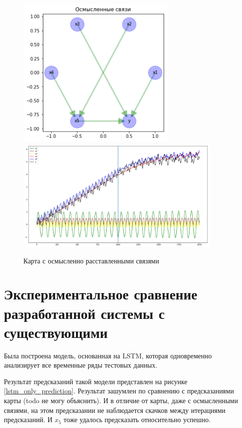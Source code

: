 \begin{figure}
	\centering
	\includegraphics[width=0.7\textwidth]{./img/lstmfcm_meaningful.png}
	\includegraphics[width=0.9\textwidth]{./img/lstmfcm_meaningful_prediction.png}
	\caption{Карта с осмысленно расставленными связями}
	\label{pic:lstmfcm_meaningful}
\end{figure}


\section{Экспериментальное сравнение разработанной системы с существующими}

Была построена модель, основанная на LSTM,
которая одновременно анализирует все временные ряды тестовых данных.

Результат предсказаний такой модели представлен на рисунке \ref{lstm_only_prediction}.
Результат зашумлен по сравнению с предсказаниями карты (todo не могу объяснить).
И в отличие от карты, даже с осмысленными связями, на этом предсказании не наблюдается скачков
между итерациями предсказаний. И $ x_5 $ тоже удалось предсказать относительно успешно.

